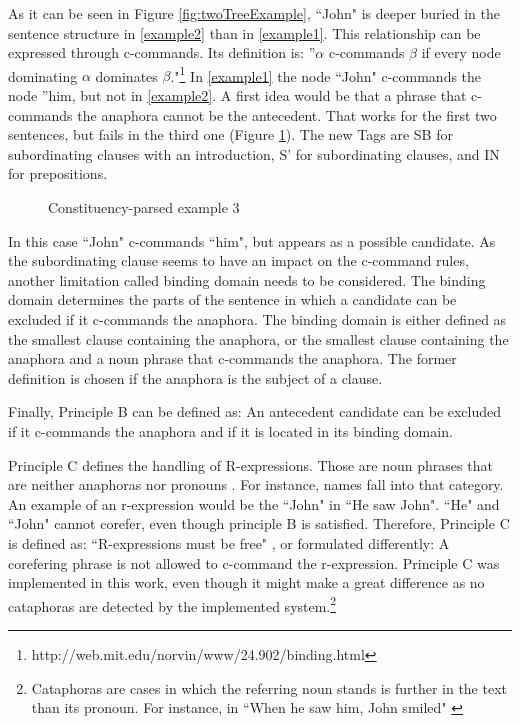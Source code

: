 As it can be seen in Figure \ref{fig:twoTreeExample}, ``John" is deeper buried in the sentence structure in \ref{example2} than in \ref{example1}. This relationship can be expressed through c-commands. Its definition is: ''$\alpha$ c-commands $\beta$ if every node dominating $\alpha$ dominates $\beta$."\footnote{http://web.mit.edu/norvin/www/24.902/binding.html} In \ref{example1} the node ``John" c-commands the node ''him, but not in \ref{example2}. A first idea would be that a phrase that c-commands the anaphora cannot be the antecedent. That works for the first two sentences, but fails in the third one (Figure \ref{fig:ExampleTreeThree}). The new Tags are SB for subordinating clauses with an introduction, S' for subordinating clauses, and IN for prepositions.

\begin{figure}[h]
    \centering\sffamily
{}
    \caption{Constituency-parsed example 3}%
    \label{fig:ExampleTreeThree}%
\end{figure}

In this case ``John" c-commands ``him", but appears as a possible candidate. As the subordinating clause seems to have an impact on the c-command rules, another limitation called binding domain needs to be considered. The binding domain determines the parts of the sentence in which a candidate can be excluded if it c-commands the anaphora. The binding domain is either defined as the smallest clause containing the anaphora, or the smallest clause containing the anaphora and a noun phrase that c-commands the anaphora. The former definition is chosen if the anaphora is the subject of a clause. 

Finally, Principle B can be defined as: An antecedent candidate can be excluded if it c-commands the anaphora and if it is located in its binding domain.

Principle C defines the handling of R-expressions. Those are noun phrases that are neither anaphoras nor pronouns \citep{crystal2011dictionary}. For instance, names fall into that category. An example of an r-expression would be the ``John" in ``He saw John". ``He" and ``John" cannot corefer, even though principle B is satisfied. Therefore, Principle C is defined as: ``R-expressions must be free" \citep{chomsky1993lectures}, or formulated differently: A corefering phrase is not allowed to c-command the r-expression. Principle C was implemented in this work, even though it might make a great difference as no cataphoras are detected by the implemented system.\footnote{Cataphoras are cases in which the referring noun stands is further in the text than its pronoun. For instance, in ``When he saw him, John smiled" \citep[p. 10]{cutting2005pragmatics}}


